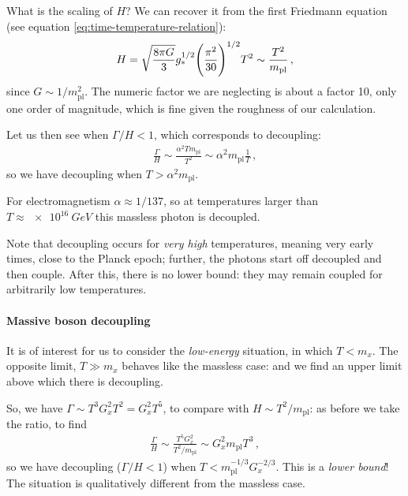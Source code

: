 \documentclass[main.tex]{subfiles}
\begin{document}
What is the scaling of \(H\)? We can recover it from the first Friedmann equation (see equation \eqref{eq:time-temperature-relation}):
%
\begin{align}
  H = \sqrt{\frac{8 \pi G }{3}} g_{*}^{1/2} \qty(\frac{\pi^2}{30})^{1/2} T^2 \sim \frac{T^2}{m _{\text{pl}}}
\,,
\end{align}
%
since \(G \sim 1/m _{\text{pl}}^2\). The numeric factor we are neglecting is about a factor 10, only one order of magnitude, which is fine given the roughness of our calculation. 

Let us then see when \(\Gamma / H < 1\), which corresponds to decoupling:
%
\begin{align}
  \frac{\Gamma}{H} \sim \frac{\alpha^2 T m _{\text{pl}}}{T^2} \sim \alpha^2 m _{\text{pl}} \frac{1}{T}
\,,
\end{align}
%
so we have decoupling when \(T > \alpha^2 m _{\text{pl}}\).

For electromagnetism \(\alpha \approx 1 / 137\), so at temperatures larger than \(T \approx \SI{e16}{GeV}\) this massless photon is decoupled.

Note that decoupling occurs for \emph{very high} temperatures, meaning very early times, close to the Planck epoch; further, the photons start off decoupled and then couple. 
After this, there is no lower bound: they may remain coupled for arbitrarily low temperatures. 




\paragraph{Massive boson decoupling}

It is of interest for us to consider the \emph{low-energy} situation, in which \(T < m_x\).
The opposite limit, \(T \gg m_x\) behaves like the massless case: and we find an upper limit above which there is decoupling. 

So, we have \(\Gamma \sim T^3 G_x^2 T^2 = G_x^2 T^{5}\), to compare with \(H \sim T^2/ m _{\text{pl}}\): as before we take the ratio, to find 
%
\begin{align}
  \frac{\Gamma}{H} \sim \frac{T^5 G_x^2}{T^2 / m _{\text{pl}}} \sim G_x^2 m _{\text{pl}} T^3 
\,,
\end{align}
%
so we have decoupling (\(\Gamma / H < 1\)) when \(T < m _{\text{pl}}^{-1/3} G_x^{-2/3}\). 
This is a \emph{lower bound}! The situation is qualitatively different from the massless case. 
\end{document}
